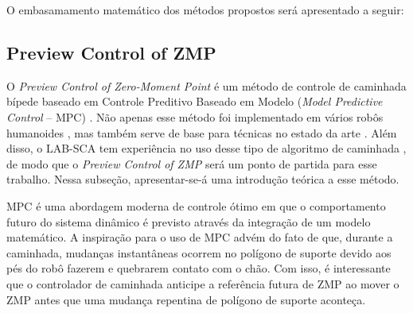 

O embasamamento matemático dos métodos propostos será apresentado a seguir:


\subsection{Preview Control of ZMP}

O \emph{Preview Control of Zero-Moment Point} é um método de controle de caminhada bípede baseado em Controle Preditivo Baseado em Modelo (\emph{Model Predictive Control} -- MPC) \cite{kajita2003}. Não apenas esse método foi implementado em vários robôs humanoides \cite{yi2016}, mas  também serve de base para técnicas no estado da arte \cite{tesemarcos,herdt2010}. Além disso, o LAB-SCA tem experiência no uso desse tipo de algoritmo de caminhada \cite{max22,tesemarcos}, de modo que o \emph{Preview Control of ZMP} será um ponto de partida para esse trabalho. Nessa subseção, apresentar-se-á uma introdução teórica a esse método.

MPC é uma abordagem moderna de controle ótimo em que o comportamento futuro do sistema dinâmico é previsto através da integração de um modelo matemático. A inspiração para o uso de MPC advém do fato de que, durante a caminhada, mudanças instantâneas ocorrem no polígono de suporte devido aos pés do robô fazerem e quebrarem contato com o chão. Com isso, é interessante que o controlador de caminhada anticipe a referência futura de ZMP ao mover o ZMP antes que uma mudança repentina de polígono de suporte aconteça.

